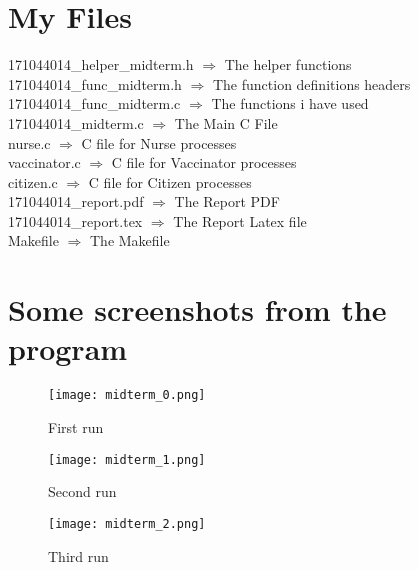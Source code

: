 \documentclass[20pt]{article}
\begin{document}
\section{My Files}
171044014\_helper\_midterm.h $\Rightarrow$ The helper functions \\
171044014\_func\_midterm.h $\Rightarrow$ The function definitions headers \\
171044014\_func\_midterm.c $\Rightarrow$ The functions i have used \\
171044014\_midterm.c $\Rightarrow$ The Main C File \\
nurse.c $\Rightarrow$ C file for Nurse processes \\
vaccinator.c $\Rightarrow$ C file for Vaccinator processes \\
citizen.c $\Rightarrow$ C file for Citizen processes \\
171044014\_report.pdf $\Rightarrow$ The Report PDF \\
171044014\_report.tex $\Rightarrow$ The Report Latex file \\
Makefile $\Rightarrow$ The Makefile \\

\section{Some screenshots from the program}
\begin{figure}[h!]
  \texttt{[image: midterm\_0.png]}
  \caption{First run}
  \label{fig:code}
\end{figure}

\begin{figure}[h!]
  \texttt{[image: midterm\_1.png]}
  \caption{Second run}
  \label{fig:code}
\end{figure}

\begin{figure}[h!]
  \texttt{[image: midterm\_2.png]}
  \caption{Third run}
  \label{fig:code}
\end{figure}
\end{document}
